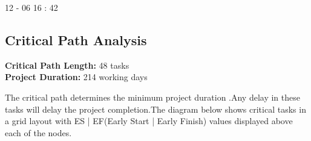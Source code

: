    12 -
    06 16 : 42 %

\subsection {
  Critical Path Analysis
}

\noindent\textbf { Critical Path Length: }
48 tasks
\\\textbf { Project Duration: }
214 working days

        The critical path determines the minimum project duration
            .Any delay in these tasks will delay the project completion.The
                diagram below shows critical tasks in a grid layout with ES |
    EF(Early Start | Early Finish) values displayed above each of the nodes.

\vspace {
  0.5em
}

